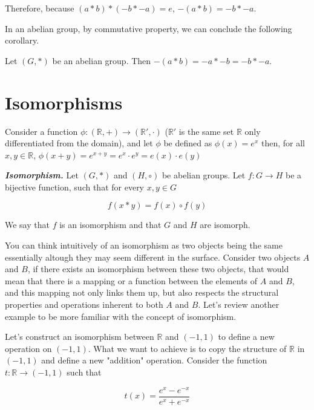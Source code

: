 \documentclass{report}
\begin{document}
\begin{enumerate}
        Therefore, because $(a*b) * (-b*-a) = e$, $-(a*b) = -b*-a$.

        In an abelian group, by commutative property, we can conclude the following corollary.

        \begin{corBox}
            Let $(G, *)$ be an abelian group. Then $-(a*b) = -a*-b = -b*-a$.
        \end{corBox}
    \end{enumerate}

    \section{Isomorphisms}

    Consider a function $\phi: (\mathbb{R}, +) \rightarrow (\mathbb{R}', \cdot)$ ($\mathbb{R}'$ is the same set $\mathbb{R}$ only differentiated from the domain), and let $\phi$ be defined as $\phi(x) = e^x$ then, for all $x,y \in \mathbb{R}$, $\phi(x+y)=e^{x+y} = e^x \cdot e^y = e(x) \cdot e(y)$

    \begin{defBox}
        \textit{\textbf{Isomorphism.}} Let $(G, *)$ and $(H, \circ)$ be abelian groups. Let $f: G \rightarrow H$ be a bijective function, such that for every $x, y \in G$

        $$ f(x*y) = f(x) \circ f(y)$$

        We say that $f$ is an isomorphism and that $G$ and $H$ are isomorph.
    \end{defBox}

    You can think intuitively of an isomorphism as two objects being the same essentially altough they may seem different in the surface. Consider two objects $A$ and $B$, if there exists an isomorphism between these two objects, that would mean that there is a mapping or a function between the elements of $A$ and $B$, and this mapping not only links them up, but also respects the structural properties and operations inherent to both $A$ and $B$. Let's review another example to be more familiar with the concept of isomorphism.

    Let's construct an isomorphism between $\mathbb{R}$ and $(-1, 1)$ to define a new operation on $(-1, 1)$. What we want to achieve is to copy the structure of $\mathbb{R}$ in $(-1, 1)$ and define a new "addition" operation. Consider the function $t: \mathbb{R} \rightarrow (-1,1)$ such that

    $$
    t(x) = \frac{e^x-e^{-x}}{e^x+e^{-x}}
    $$
\end{document}
